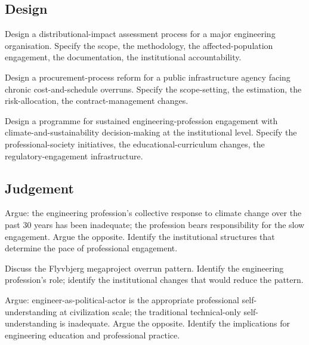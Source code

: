 \subsection*{Design}

\begin{exercise}
Design a distributional-impact assessment process for a major engineering organisation. Specify the scope, the methodology, the affected-population engagement, the documentation, the institutional accountability.
\end{exercise}

\begin{exercise}
Design a procurement-process reform for a public infrastructure agency facing chronic cost-and-schedule overruns. Specify the scope-setting, the estimation, the risk-allocation, the contract-management changes.
\end{exercise}

\begin{exercise}
Design a programme for sustained engineering-profession engagement with climate-and-sustainability decision-making at the institutional level. Specify the professional-society initiatives, the educational-curriculum changes, the regulatory-engagement infrastructure.
\end{exercise}

\subsection*{Judgement}

\begin{exercise}
Argue: the engineering profession's collective response to climate change over the past $30$ years has been inadequate; the profession bears responsibility for the slow engagement. Argue the opposite. Identify the institutional structures that determine the pace of professional engagement.
\end{exercise}

\begin{exercise}
Discuss the Flyvbjerg megaproject overrun pattern. Identify the engineering profession's role; identify the institutional changes that would reduce the pattern.
\end{exercise}

\begin{exercise}
Argue: engineer-as-political-actor is the appropriate professional self-understanding at civilization scale; the traditional technical-only self-understanding is inadequate. Argue the opposite. Identify the implications for engineering education and professional practice.
\end{exercise}

